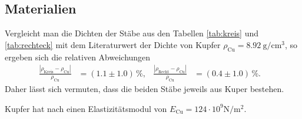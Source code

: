 \subsection{Materialien}
Vergleicht man die Dichten der Stäbe aus den Tabellen \ref{tab:kreis} und \ref{tab:rechteck} mit dem Literaturwert \cite{geschke} 
der Dichte von Kupfer $\rho_\text{Cu} = \qty{8.92}{\gram / \cm ^3}$, so ergeben sich die relativen Abweichungen
\begin{align*}
    \frac{|\rho_\text{Kreis} - \rho_\text{Cu}|}{\rho_\text{Cu}} &= (\num{1.1} \pm \num{1.0}) \, \%, &
    \frac{|\rho_\text{Recht} - \rho_\text{Cu}|}{\rho_\text{Cu}} &= (\num{0.4} \pm \num{1.0}) \, \%. &
\end{align*}
Daher lässt sich vermuten, dass die beiden Stäbe jeweils aus Kuper bestehen.

\noindent
Kupfer hat nach \cite{uni_kiel} einen Elastizitätsmodul von $E_\text{Cu} = {124} \cdot 10^9 \unit{\newton / \meter^2}$.

